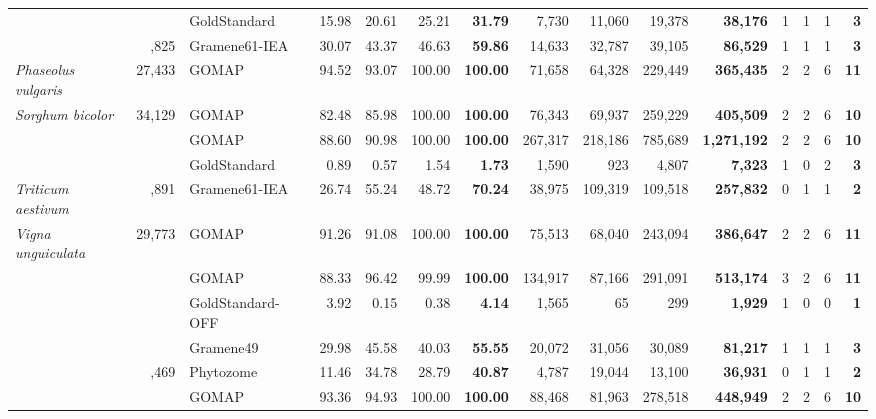\documentclass[utf8]{frontiersSCNS}
\begin{document}
\begin{table}[t]
{\begin{threeparttable}
\begin{tabular}{lrlrrr>{\bfseries}r|rrr>{\bfseries}r|rrr>{\bfseries}r}
 &  & GoldStandard & 15.98 & 20.61 & 25.21 & 31.79 & 7,730 & 11,060 & 19,378 & 38,176 & 1 & 1 & 1 & 3\\

\rowcolor{gray!6}  \multirow{-3}{*}{\raggedright\arraybackslash \textit{Oryza sativa}} & \multirow{-3}{*}{\raggedleft\arraybackslash 35,825} & Gramene61-IEA & 30.07 & 43.37 & 46.63 & 59.86 & 14,633 & 32,787 & 39,105 & 86,529 & 1 & 1 & 1 & 3\\
\cmidrule{1-15}
\textit{Phaseolus vulgaris} & 27,433 & GOMAP & 94.52 & 93.07 & 100.00 & 100.00 & 71,658 & 64,328 & 229,449 & 365,435 & 2 & 2 & 6 & 11\\
\cmidrule{1-15}
\rowcolor{gray!6}  \textit{Sorghum bicolor} & 34,129 & GOMAP & 82.48 & 85.98 & 100.00 & 100.00 & 76,343 & 69,937 & 259,229 & 405,509 & 2 & 2 & 6 & 10\\
\cmidrule{1-15}
 &  & GOMAP & 88.60 & 90.98 & 100.00 & 100.00 & 267,317 & 218,186 & 785,689 & 1,271,192 & 2 & 2 & 6 & 10\\

\rowcolor{gray!6}   &  & GoldStandard & 0.89 & 0.57 & 1.54 & 1.73 & 1,590 & 923 & 4,807 & 7,323 & 1 & 0 & 2 & 3\\

\multirow{-3}{*}{\raggedright\arraybackslash \textit{Triticum aestivum}} & \multirow{-3}{*}{\raggedleft\arraybackslash 107,891} & Gramene61-IEA & 26.74 & 55.24 & 48.72 & 70.24 & 38,975 & 109,319 & 109,518 & 257,832 & 0 & 1 & 1 & 2\\
\cmidrule{1-15}
\rowcolor{gray!6}  \textit{Vigna unguiculata} & 29,773 & GOMAP & 91.26 & 91.08 & 100.00 & 100.00 & 75,513 & 68,040 & 243,094 & 386,647 & 2 & 2 & 6 & 11\\
\cmidrule{1-15}
 &  & GOMAP & 88.33 & 96.42 & 99.99 & 100.00 & 134,917 & 87,166 & 291,091 & 513,174 & 3 & 2 & 6 & 11\\

\rowcolor{gray!6}   &  & GoldStandard-OFF & 3.92 & 0.15 & 0.38 & 4.14 & 1,565 & 65 & 299 & 1,929 & 1 & 0 & 0 & 1\\

 &  & Gramene49 & 29.98 & 45.58 & 40.03 & 55.55 & 20,072 & 31,056 & 30,089 & 81,217 & 1 & 1 & 1 & 3\\

\rowcolor{gray!6}  \multirow{-4}{*}{\raggedright\arraybackslash \textit{Zea mays} B73.v3} & \multirow{-4}{*}{\raggedleft\arraybackslash 39,469} & Phytozome & 11.46 & 34.78 & 28.79 & 40.87 & 4,787 & 19,044 & 13,100 & 36,931 & 0 & 1 & 1 & 2\\
\cmidrule{1-15}
 &  & GOMAP & 93.36 & 94.93 & 100.00 & 100.00 & 88,468 & 81,963 & 278,518 & 448,949 & 2 & 2 & 6 & 10\\


\end{tabular}
\end{threeparttable}}
\end{table}
\end{document}
